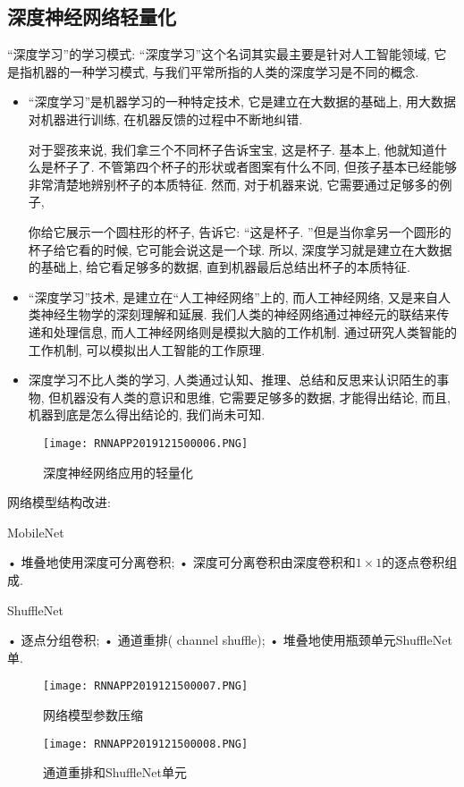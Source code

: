 \subsection{深度神经网络轻量化}
“深度学习”的学习模式: “深度学习”这个名词其实最主要是针对人工智能领域, 它是指机器的一种学习模式, 与我们平常所指的人类的深度学习是不同的概念.
\begin{itemize}
\item “深度学习”是机器学习的一种特定技术, 它是建立在大数据的基础上, 用大数据对机器进行训练, 在机器反馈的过程中不断地纠错.
\begin{example}
对于婴孩来说, 我们拿三个不同杯子告诉宝宝, 这是杯子. 基本上, 他就知道什么是杯子了. 不管第四个杯子的形状或者图案有什么不同, 但孩子基本已经能够非常清楚地辨别杯子的本质特征.
然而, 对于机器来说, 它需要通过足够多的例子,
\end{example}
\begin{example}
你给它展示一个圆柱形的杯子, 告诉它: “这是杯子. ”但是当你拿另一个圆形的杯子给它看的时候, 它可能会说这是一个球. 所以, 深度学习就是建立在大数据的基础上, 给它看足够多的数据, 直到机器最后总结出杯子的本质特征.
\end{example}
\item “深度学习”技术, 是建立在“人工神经网络”上的, 而人工神经网络, 又是来自人类神经生物学的深刻理解和延展. 我们人类的神经网络通过神经元的联结来传递和处理信息, 而人工神经网络则是模拟大脑的工作机制.
通过研究人类智能的工作机制, 可以模拟出人工智能的工作原理.

\item 深度学习不比人类的学习, 人类通过认知、推理、总结和反思来认识陌生的事物, 但机器没有人类的意识和思维, 它需要足够多的数据, 才能得出结论, 而且, 机器到底是怎么得出结论的, 我们尚未可知.
\end{itemize}
\begin{figure}[H]
\centering
\texttt{[image: RNNAPP2019121500006.PNG]}
\caption{深度神经网络应用的轻量化}
\label{RNNAPP2019121500006}
\end{figure}

网络模型结构改进:

MobileNet

• 堆叠地使用深度可分离卷积;
• 深度可分离卷积由深度卷积和$1\times 1$的逐点卷积组成.

ShuffleNet

• 逐点分组卷积;
• 通道重排( channel shuffle);
• 堆叠地使用瓶颈单元ShuffleNet单.
\begin{figure}[H]
\centering
\texttt{[image: RNNAPP2019121500007.PNG]}
\caption{网络模型参数压缩}
\label{RNNAPP2019121500007}
\end{figure}
\begin{figure}[H]
\centering
\texttt{[image: RNNAPP2019121500008.PNG]}
\caption{通道重排和ShuffleNet单元}
\label{RNNAPP2019121500008}
\end{figure}

